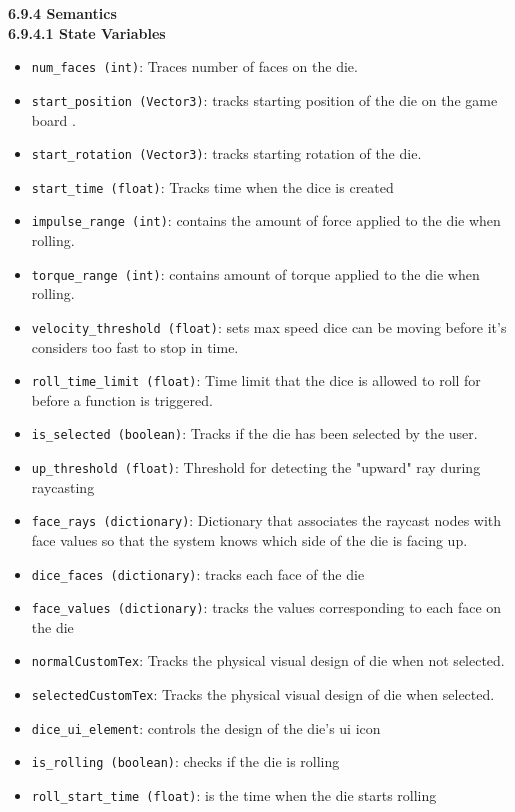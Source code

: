 \documentclass[12pt, titlepage]{article}
\begin{document}
\noindent \textbf{6.9.4 Semantics}\\
\textbf{6.9.4.1 State Variables}\\
\begin{itemize}
	\item \texttt{num\_faces (int)}: Traces number of faces on the die.
	\item \texttt{start\_position (Vector3)}: tracks starting position of the die on the game board .
	\item \texttt{start\_rotation (Vector3)}: tracks starting rotation of the die.
	\item \texttt{start\_time (float)}: Tracks time when the dice is created
	\item \texttt{impulse\_range (int)}: contains the amount of force applied to the die when rolling.
	\item \texttt{torque\_range (int)}: contains amount of torque applied to the die when rolling.
	\item \texttt{velocity\_threshold (float)}: sets max speed dice can be moving before it's considers too fast to stop in time.
	\item \texttt{roll\_time\_limit (float)}: Time limit that the dice is allowed to roll for before a function is triggered.
	\item \texttt{is\_selected (boolean)}: Tracks if the die has been selected by the user.
	\item \texttt{up\_threshold (float)}: Threshold for detecting the "upward" ray during raycasting
	\item \texttt{face\_rays (dictionary)}: Dictionary that associates the raycast nodes with face values so that the system knows which side of the die is facing up.
	\item \texttt{dice\_faces (dictionary)}: tracks each face of the die
	\item \texttt{face\_values (dictionary)}: tracks the values corresponding to each face on the die
	\item \texttt{normalCustomTex}: Tracks the physical visual design of die when not selected.
	\item \texttt{selectedCustomTex}: Tracks the physical visual design of die when selected.
	\item \texttt{dice\_ui\_element}: controls the design of the die's ui icon

	\item \texttt{is\_rolling (boolean)}: checks if the die is rolling

	\item \texttt{roll\_start\_time (float)}: is the time when the die starts rolling
\end{itemize}
\end{document}
